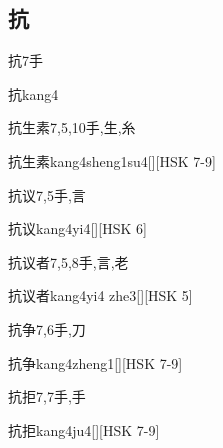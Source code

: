 \subsection*{抗}

\begin{Entry}{抗}{7}{⼿}
  \begin{Phonetics}{抗}{kang4}
  \end{Phonetics}
\end{Entry}

\begin{Entry}{抗生素}{7,5,10}{⼿,⽣,⽷}
  \begin{Phonetics}{抗生素}{kang4sheng1su4}[][HSK 7-9]
  \end{Phonetics}
\end{Entry}

\begin{Entry}{抗议}{7,5}{⼿,⾔}
  \begin{Phonetics}{抗议}{kang4yi4}[][HSK 6]
  \end{Phonetics}
\end{Entry}

\begin{Entry}{抗议者}{7,5,8}{⼿,⾔,⽼}
  \begin{Phonetics}{抗议者}{kang4yi4 zhe3}[][HSK 5]
  \end{Phonetics}
\end{Entry}

\begin{Entry}{抗争}{7,6}{⼿,⼑}
  \begin{Phonetics}{抗争}{kang4zheng1}[][HSK 7-9]
  \end{Phonetics}
\end{Entry}

\begin{Entry}{抗拒}{7,7}{⼿,⼿}
  \begin{Phonetics}{抗拒}{kang4ju4}[][HSK 7-9]
  \end{Phonetics}
\end{Entry}

